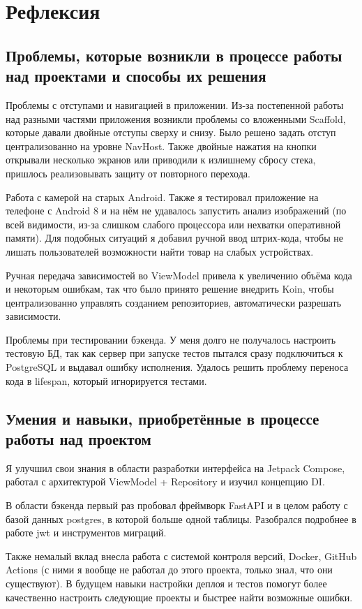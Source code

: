 \documentclass[14pt,a4paper]{extarticle}
\begin{document}
\section{Рефлексия}

\subsection{Проблемы, которые возникли в процессе работы над проектами и способы их решения}
Проблемы с отступами и навигацией в приложении.
Из-за постепенной работы над разными частями приложения возникли проблемы со вложенными Scaffold, которые давали двойные отступы сверху и снизу. Было решено задать отступ централизованно на уровне NavHost. Также двойные нажатия на кнопки открывали несколько экранов или приводили к излишнему сбросу стека, пришлось реализовывать защиту от повторного перехода.

Работа с камерой на старых Android.
Также я тестировал приложение на телефоне с Android 8 и на нём не удавалось запустить анализ изображений (по всей видимости, из-за слишком слабого процессора или нехватки оперативной памяти). Для подобных ситуаций я добавил ручной ввод штрих-кода, чтобы не лишать пользователей возможности найти товар на слабых устройствах.

Ручная передача зависимостей во ViewModel привела к увеличению объёма кода и некоторым ошибкам, так что было принято решение внедрить Koin, чтобы централизованно управлять созданием репозиториев, автоматически разрешать зависимости.

Проблемы при тестировании бэкенда.
У меня долго не получалось настроить тестовую БД, так как сервер при запуске тестов пытался сразу подключиться к PostgreSQL и выдавал ошибку исполнения. Удалось решить проблему переноса кода в lifespan, который игнорируется тестами.

\subsection{Умения и навыки, приобретённые в процессе работы над проектом}
Я улучшил свои знания в области разработки интерфейса на Jetpack Compose, работал с архитектурой ViewModel + Repository и изучил концепцию DI.

В области бэкенда первый раз пробовал фреймворк FastAPI и в целом работу с базой данных postgres, в которой больше одной таблицы. Разобрался подробнее в работе jwt и инструментов миграций.

Также немалый вклад внесла работа с системой контроля версий, Docker, GitHub Actions (с ними я вообще не работал до этого проекта, только знал, что они существуют). В будущем навыки настройки деплоя и тестов помогут более качественно настроить следующие проекты и быстрее найти возможные ошибки.
\end{document}
